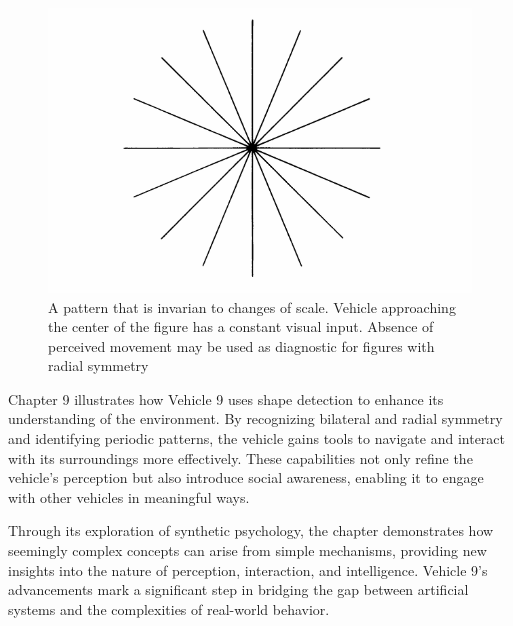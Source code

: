 \documentclass{article}
\begin{document}
	\begin{figure}[h]
		\centering
		\includegraphics[scale=0.5]{images/figure_17.png}
		\caption{A pattern that is invarian to changes of scale. Vehicle approaching the center of the figure has a constant visual input. Absence of perceived movement may be used as diagnostic for figures with radial symmetry}
		\label{fig:vehicle-17}
	\end{figure}

	Chapter 9 illustrates how Vehicle 9 uses shape detection to enhance its understanding of the environment. By recognizing bilateral and radial symmetry and identifying periodic patterns, the vehicle gains tools to navigate and interact with its surroundings more effectively. These capabilities not only refine the vehicle's perception but also introduce social awareness, enabling it to engage with other vehicles in meaningful ways.  

	Through its exploration of synthetic psychology, the chapter demonstrates how seemingly complex concepts can arise from simple mechanisms, providing new insights into the nature of perception, interaction, and intelligence. Vehicle 9's advancements mark a significant step in bridging the gap between artificial systems and the complexities of real-world behavior.  
\end{document}
